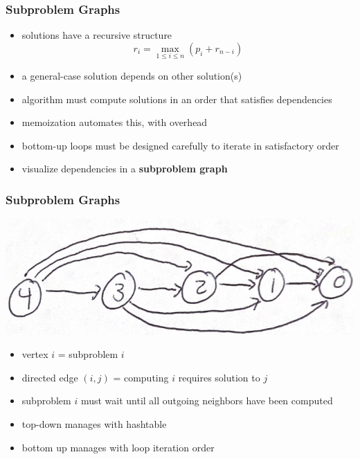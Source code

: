 \documentclass[10pt,aspectratio=169]{beamer}
\begin{document}
\begin{frame} \frametitle{Subproblem Graphs}
\begin{itemize}
  \item solutions have a recursive structure
        \[ r_i = \max_{1 \leq i \leq n} (p_i + r_{n-i}) \]
  \item a general-case solution depends on other solution(s)
  \item algorithm must compute solutions in an order that satisfies dependencies
  \item memoization automates this, with overhead
  \item bottom-up loops must be designed carefully to iterate in satisfactory order
  \item visualize dependencies in a \textbf{subproblem graph}
\end{itemize}
\end{frame}

\begin{frame} \frametitle{Subproblem Graphs}
  \begin{center}
    \includegraphics[height=.8in]{subproblem_dependencies.png}
  \end{center}
  \begin{itemize}
  \item vertex $i$ = subproblem $i$
  \item directed edge $(i, j)$ = computing $i$ requires solution to $j$
  \item subproblem $i$ must wait until all outgoing neighbors have been computed
  \item top-down manages with hashtable
  \item bottom up manages with loop iteration order
  \end{itemize}
\end{frame}
\end{document}
